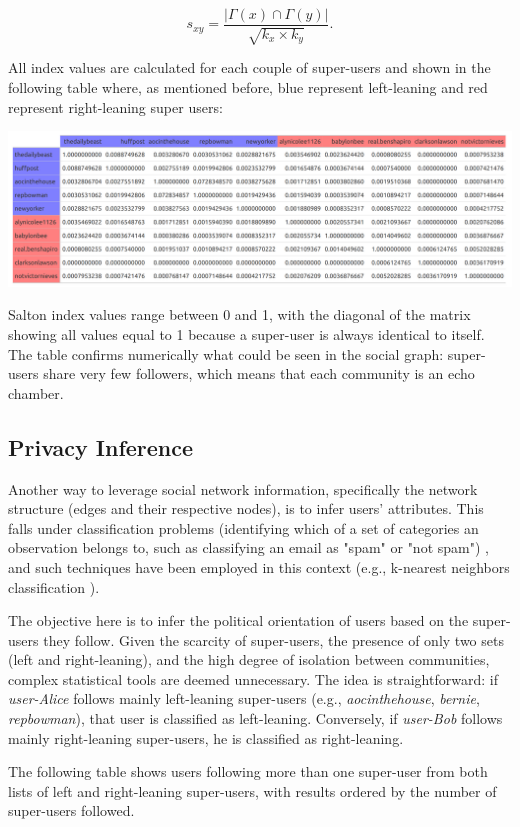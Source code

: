 $$s_{xy}=\frac{|\Gamma(x)\cap\Gamma(y)|}{\sqrt{k_x\times k_y}}.$$

All index values are calculated for each couple of super-users and shown in the following table where, as mentioned before, blue represent left-leaning and red represent right-leaning super users: 

\aCapo{}
\includegraphics[width = .5\textwidth]{images/final_salton_matrix.png}

Salton index values range between 0 and 1, with the diagonal of the matrix showing all values equal to 1 because a super-user is always identical to itself. The table confirms numerically what could be seen in the social graph: super-users share very few followers, which means that each community is an echo chamber.

\subsection{Privacy Inference}
Another way to leverage social network information, specifically the network structure (edges and their respective nodes), is to infer users' attributes. This falls under classification problems (identifying which of a set of categories an observation belongs to, such as classifying an email as "spam" or "not spam") \cite{wikiClassification}, and such techniques have been employed in this context (e.g., k-nearest neighbors classification \cite{wikiKNN}).

The objective here is to infer the political orientation of users based on the super-users they follow. Given the scarcity of super-users, the presence of only two sets (left and right-leaning), and the high degree of isolation between communities, complex statistical tools are deemed unnecessary. The idea is straightforward: if \textit{user-Alice} follows mainly left-leaning super-users (e.g., \textit{aocinthehouse}, \textit{bernie}, \textit{repbowman}), that user is classified as left-leaning. Conversely, if \textit{user-Bob} follows mainly right-leaning super-users, he is classified as right-leaning.

The following table shows users following more than one super-user from both lists of left and right-leaning super-users, with results ordered by the number of super-users followed.

